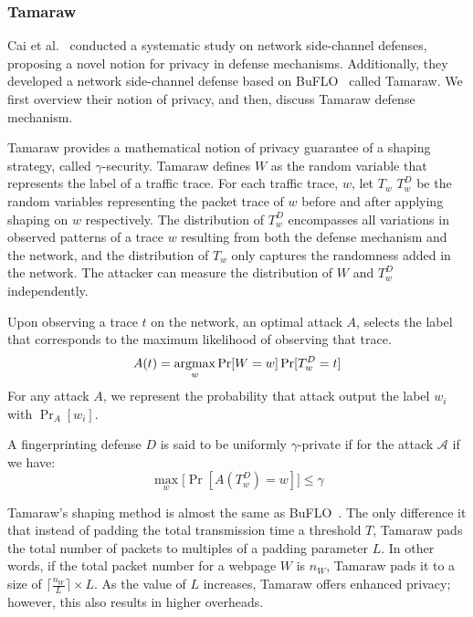 \subsubsection{Tamaraw}\label{subsubsec:tamaraw}
Cai et al.~\cite{cai2014systematic} conducted a systematic study on network side-channel defenses, proposing a novel notion for privacy in defense mechanisms.
Additionally, they developed a network side-channel defense based on BuFLO~\cite{dyer2012peek} called Tamaraw. 
We first overview their notion of privacy, and then, discuss Tamaraw defense mechanism.


Tamaraw \cite{cai2014tamaraw} provides a
mathematical notion of privacy guarantee of a shaping strategy, called $\gamma$-security.
Tamaraw defines $W$ as the random variable that represents the label of a
traffic trace.
For each traffic trace, $w$, let $T_{w}$ $T_{w}^{D}$ be the random variables representing
the packet trace of $w$ before and after applying shaping on $w$ respectively.
The distribution of $T_{w}^D$ encompasses all variations in observed
patterns of a trace $w$ resulting from both the defense mechanism and the
network, and the distribution of $T_{w}$ only captures the randomness added in the network.
The attacker can measure the distribution of $W$ and $T_{w}^{D}$ independently.

Upon observing a trace $t$ on the network, an optimal attack $A$, selects the
label that corresponds to the maximum likelihood of observing that trace.
\begin{equation*}
  A(t) = \operatorname*{argmax}_{w}{\Pr[W=w]\Pr[T_{w}^{D}=t]}
\end{equation*}
For any attack $A$, we represent the probability that attack output the label $w_i$ with $\Pr_A[w_i]$.
\begin{definition}
  A fingerprinting defense $D$ is said to be uniformly $\gamma$-private if for the attack $\mathcal{A}$ if we have:
  \begin{equation*}
    \max_w\big[\Pr[A(T_w^D)=w]\big] \leq \gamma
  \end{equation*}
\end{definition}

Tamaraw's shaping method is almost the same as BuFLO~\cite{dyer2012peek}. The only difference it that instead of padding the total transmission time a threshold $T$, Tamaraw pads the total number of packets to multiples of a padding parameter $L$.
In other words, if the total packet number for a webpage $W$ is $n_W$, Tamaraw pads it to a size of $\lceil \frac{n_W}{L} \rceil \times L$.
As the value of $L$ increases, Tamaraw offers enhanced privacy; however, this also results in higher overheads.


